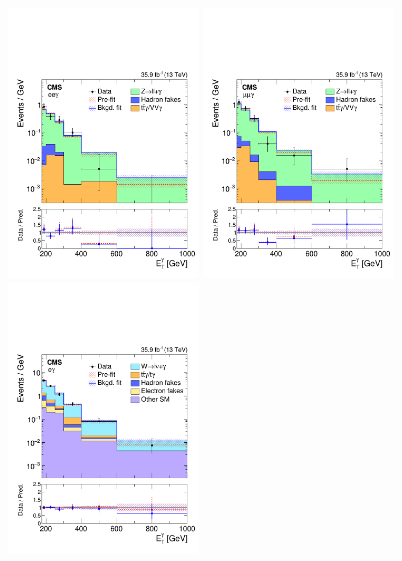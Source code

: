 \begin{figure}[htbp]
  \begin{center}
    \includegraphics[width=0.45\textwidth]{figures/exo16053/Figure_005-a.pdf}
    \includegraphics[width=0.45\textwidth]{figures/exo16053/Figure_005-b.pdf}
    \includegraphics[width=0.45\textwidth]{figures/exo16053/Figure_005-c.pdf}

\end{center}
\end{figure}
